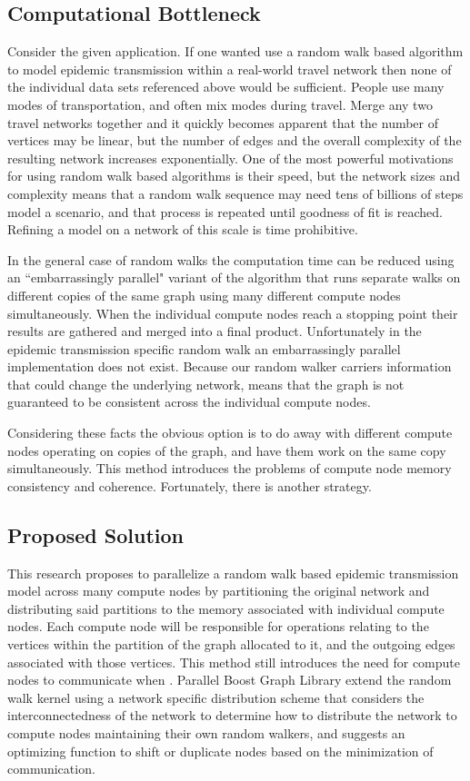 \subsection{Computational Bottleneck}

Consider the given application. If one wanted use a random walk based algorithm to model epidemic transmission within a real-world travel network then none of the individual data sets referenced above would be sufficient. People use many modes of transportation, and often mix modes during travel. Merge any two travel networks together and it quickly becomes apparent that the number of vertices may be linear, but the number of edges and the overall complexity of the resulting network increases exponentially.
One of the most powerful motivations for using random walk based algorithms is their speed, but the network sizes and complexity means that a random walk sequence may need tens of billions of steps model a scenario, and that process is repeated until goodness of fit is reached. Refining a model on a network of this scale is time prohibitive.

In the general case of random walks the computation time can be reduced using an ``embarrassingly parallel" variant of the algorithm that runs separate walks on different copies of the same graph using many different compute nodes simultaneously. When the individual compute nodes reach a stopping point their results are gathered and merged into a final product. Unfortunately in the epidemic transmission specific random walk an embarrassingly parallel implementation does not exist. Because our random walker carriers information that could change the underlying network, means that the graph is not guaranteed to be consistent across the individual compute nodes.

Considering these facts the obvious option is to do away with different compute nodes operating on copies of the graph, and have them work on the same copy simultaneously. This method introduces the problems of compute node memory consistency and coherence. Fortunately, there is another strategy. 

\subsection{Proposed Solution}

This research proposes to parallelize a random walk based epidemic transmission model across many compute nodes by partitioning the original network and distributing said partitions to the memory associated with individual compute nodes. Each compute node will be responsible for operations relating to the vertices within the partition of the graph allocated to it, and the outgoing edges associated with those vertices. This method still introduces the need for compute nodes to communicate when . Parallel Boost Graph Library extend the random walk kernel using a network specific distribution scheme that considers the interconnectedness of the network to determine how to distribute the network to compute nodes maintaining their own random walkers, and suggests an optimizing function to shift or duplicate nodes based on the minimization of communication.

